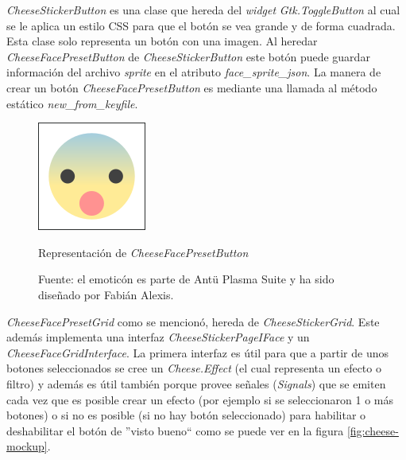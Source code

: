 \documentclass[a4paper,openright,12pt]{report}
\begin{document}
\textit{CheeseStickerButton} es una clase que hereda del \textit{widget}
\textit{Gtk.ToggleButton} al cual se le aplica un estilo CSS para que el botón
se vea grande y de forma cuadrada. Esta clase solo representa un botón con una
imagen. Al heredar \textit{CheeseFacePresetButton} de
\textit{CheeseStickerButton} este botón puede guardar información del archivo
\textit{sprite} en el atributo \textit{face\_sprite\_json}. La manera de crear
un botón \textit{CheeseFacePresetButton} es mediante una llamada al método
estático \textit{new\_from\_keyfile}.\\

\begin{figure}[!h]
  \centering
    \includegraphics{../images/cheese-mockup-face-preset-button.png}\par
  \caption{Representación de \textit{{CheeseFacePresetButton}}}
    \label{fig:cheese-sticker-button}
  \caption*{Fuente: el emoticón es parte de Antü Plasma Suite y ha sido
    diseñado por Fabián Alexis.}
\end{figure}

\textit{CheeseFacePresetGrid} como se mencionó, hereda de
\textit{CheeseStickerGrid}. Este además implementa una interfaz
\textit{CheeseStickerPageIFace} y un \textit{CheeseFaceGridInterface}. La
primera interfaz es útil para que a partir de unos botones seleccionados se
cree un \textit{Cheese.Effect} (el cual representa un efecto o filtro) y además
es útil también porque provee señales (\textit{Signals}) que se emiten cada vez
que es posible crear un efecto (por ejemplo si se seleccionaron 1 o más botones)
o si no es posible (si no hay botón seleccionado) para habilitar o deshabilitar
el botón de ''visto bueno`` como se puede ver en la figura
\ref{fig:cheese-mockup}.\\
\end{document}

